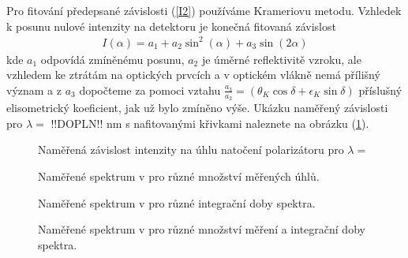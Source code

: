 Pro fitování předepsané závislosti (\ref{I2}) používáme Krameriovu metodu. Vzhledek k posunu nulové intenzity na detektoru je konečná fitovaná závislost
\begin{eqnarray}
I(\alpha)=a_1+a_2\sin^2(\alpha)+a_3\sin(2\alpha)
\end{eqnarray}
kde $a_1$ odpovídá zmíněnému posunu, $a_2$ je úměrné reflektivitě vzroku, ale vzhledem ke ztrátám na optických prvcích a v optickém vlákně nemá přílišný význam a z $a_3$ dopočteme za pomoci vztahu $\frac{a_3}{a_2}=(\theta_K\cos\delta+\epsilon_K\sin\delta)$ příslušný elisometrický koeficient, jak už bylo zmíněno výše. Ukázku naměřený závislosti pro $\lambda=$ !!DOPLN!! nm s nafitovanými křivkami naleznete na obrázku (\ref{TPE0}).

\begin{figure}

\caption{Naměřená závislost intenzity na úhlu natočení polarizátoru pro $\lambda =$}
\label{TPE0}
\end{figure}

\begin{figure}

\caption{Naměřené spektrum v pro různé množství měřených úhlů.}
\label{TPE1}
\end{figure}

\begin{figure}

\caption{Naměřené spektrum v pro různé integrační doby spektra.}
\label{TPE2}
\end{figure}

\begin{figure}

\caption{Naměřené spektrum v pro různé množství měření a integrační doby spektra.}
\label{TPE3}
\end{figure}


